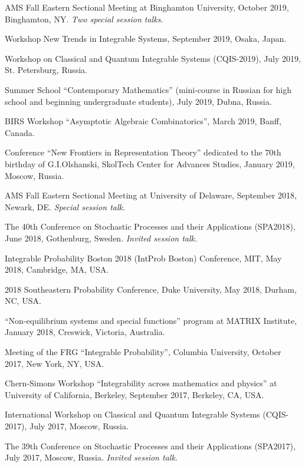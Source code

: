 \documentclass[letterpaper,11pt]{article}
\begin{document}
\begin{etaremune}
	\item AMS Fall Eastern Sectional Meeting
	at
	Binghamton University,
	October 2019,
	Binghamton, NY.
	\emph{Two special session talks.}
	\item
		Workshop New Trends in Integrable Systems,
		September 2019, Osaka, Japan.
	\item
		Workshop on Classical and Quantum Integrable
		Systems (CQIS-2019), July 2019, St. Petersburg, Russia.
	\item
		Summer School ``Contemporary Mathematics'' (mini-course in Russian for
		high school and beginning undergraduate students),
		July 2019, Dubna, Russia.
	\item
		BIRS Workshop ``Asymptotic Algebraic Combinatorics'',
		March 2019, Banff, Canada.
	\item Conference ``New Frontiers in Representation Theory'' dedicated to the 70th birthday of G.I.Olshanski, SkolTech Center for Advances Studies, January 2019, Moscow, Russia.
\item AMS Fall Eastern Sectional Meeting
	at University of Delaware,
	September 2018, Newark, DE.
		\emph{Special session talk.}
	\item
    The 40th Conference on Stochastic Processes and their
    Applications (SPA2018), June 2018,
		Gothenburg, Sweden.
		\emph{Invited session talk.}
	\item
		Integrable Probability Boston 2018 (IntProb Boston)
		Conference,
		MIT,
		May 2018,
		Cambridge, MA, USA.
	\item
		2018 Southeastern Probability Conference,
		Duke University,
		May 2018,
		Durham, NC, USA.
	\item
		``Non-equilibrium systems and special functions'' program at MATRIX Institute,
		January 2018,
		Creswick, Victoria, Australia.
	\item
		Meeting of the
		FRG ``Integrable Probability'', Columbia University,
		October 2017, New York, NY, USA.

	\item Chern-Simons Workshop
		``Integrability across mathematics and physics''
		 at University of California, Berkeley,
			September 2017, Berkeley, CA, USA.
	\item
	      International Workshop on Classical and Quantum Integrable
	      Systems (CQIS-2017), July 2017, Moscow, Russia.
	\item
	      The 39th Conference on Stochastic Processes and their
	      Applications (SPA2017), July 2017, Moscow, Russia.
				\emph{Invited session talk.}


\end{etaremune}
\end{document}
